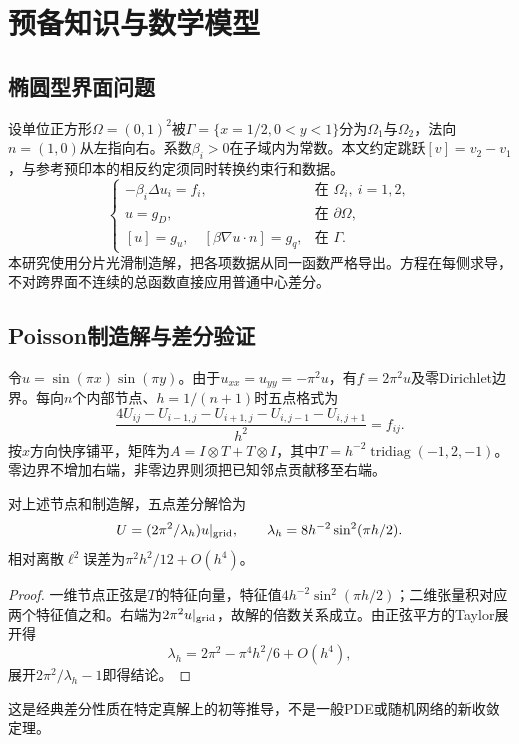 \chapter{预备知识与数学模型}
\section{椭圆型界面问题}
设单位正方形$\Omega=(0,1)^2$被$\Gamma=\{x=1/2,0<y<1\}$分为$\Omega_1$与$\Omega_2$，法向$n=(1,0)$从左指向右。系数$\beta_i>0$在子域内为常数。本文约定跳跃$[v]=v_2-v_1$，与参考预印本的相反约定须同时转换约束行和数据。
\begin{equation}\label{eq:interface}
\begin{cases}
-\beta_i\Delta u_i=f_i,&\text{在 }\Omega_i,\ i=1,2,\\
u=g_D,&\text{在 }\partial\Omega,\\
[u]=g_u,\quad[\beta\nabla u\cdot n]=g_q,&\text{在 }\Gamma.
\end{cases}
\end{equation}
本研究使用分片光滑制造解，把各项数据从同一函数严格导出。方程在每侧求导，不对跨界面不连续的总函数直接应用普通中心差分。

\section{Poisson制造解与差分验证}
令$u=\sin(\pi x)\sin(\pi y)$。由于$u_{xx}=u_{yy}=-\pi^2u$，有$f=2\pi^2u$及零Dirichlet边界。每向$n$个内部节点、$h=1/(n+1)$时五点格式为
\begin{equation}\label{eq:fdm}
\frac{4U_{ij}-U_{i-1,j}-U_{i+1,j}-U_{i,j-1}-U_{i,j+1}}{h^2}=f_{ij}.
\end{equation}
按$x$方向快序铺平，矩阵为$A=I\otimes T+T\otimes I$，其中$T=h^{-2}\operatorname{tridiag}(-1,2,-1)$。零边界不增加右端，非零边界则须把已知邻点贡献移至右端。

\begin{proposition}[正弦算例的离散误差]
对上述节点和制造解，五点差分解恰为
\[U=(2\pi^2/\lambda_h)u|_{\rm grid},\qquad\lambda_h=8h^{-2}\sin^2(\pi h/2).\]
相对离散$\ell^2$误差为$\pi^2h^2/12+O(h^4)$。
\end{proposition}
\begin{proof}
一维节点正弦是$T$的特征向量，特征值$4h^{-2}\sin^2(\pi h/2)$；二维张量积对应两个特征值之和。右端为$2\pi^2u|_{\rm grid}$，故解的倍数关系成立。由正弦平方的Taylor展开得
\[\lambda_h=2\pi^2-\pi^4h^2/6+O(h^4),\]
展开$2\pi^2/\lambda_h-1$即得结论。
\end{proof}
这是经典差分性质在特定真解上的初等推导，不是一般PDE或随机网络的新收敛定理。

